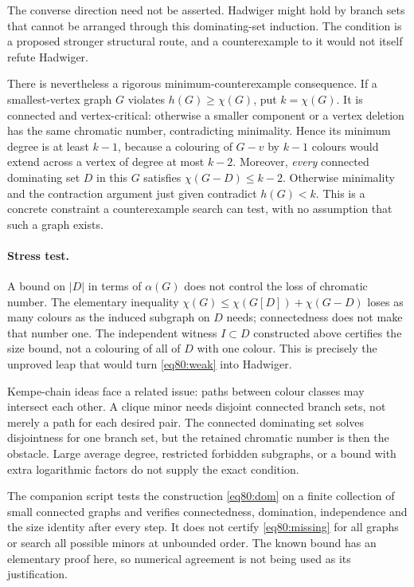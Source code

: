 \documentclass[11pt,a4paper]{article}
\numberwithin{equation}{section}
\begin{document}
The converse direction need not be asserted. Hadwiger might hold by branch
sets that cannot be arranged through this dominating-set induction. The
condition is a proposed stronger structural route, and a counterexample
to it would not itself refute Hadwiger.

There is nevertheless a rigorous minimum-counterexample consequence.
If a smallest-vertex graph $G$ violates $h(G)\geq\chi(G)$, put
$k=\chi(G)$. It is connected and vertex-critical: otherwise a smaller
component or a vertex deletion has the same chromatic number, contradicting
minimality. Hence its minimum degree is at least $k-1$, because a colouring
of $G-v$ by $k-1$ colours would extend across a vertex of degree at most
$k-2$. Moreover, \emph{every} connected dominating set $D$ in this $G$
satisfies $\chi(G-D)\leq k-2$. Otherwise minimality and the contraction
argument just given contradict $h(G)<k$. This is a concrete constraint a
counterexample search can test, with no assumption that such a graph exists.

\paragraph{Stress test.}
A bound on $|D|$ in terms of $\alpha(G)$ does not control the loss of
chromatic number. The elementary inequality
$\chi(G)\leq\chi(G[D])+\chi(G-D)$ loses as many colours as the induced
subgraph on $D$ needs; connectedness does not make that number one.
The independent witness $I\subset D$ constructed above certifies the size
bound, not a colouring of all of $D$ with one colour. This is precisely the
unproved leap that would turn \eqref{eq80:weak} into Hadwiger.

Kempe-chain ideas face a related issue: paths between colour classes may
intersect each other. A clique minor needs disjoint connected branch sets,
not merely a path for each desired pair. The connected dominating set
solves disjointness for one branch set, but the retained chromatic number
is then the obstacle. Large average degree, restricted forbidden subgraphs,
or a bound with extra logarithmic factors do not supply the exact condition.

The companion script tests the construction \eqref{eq80:dom} on a finite
collection of small connected graphs and verifies connectedness, domination,
independence and the size identity after every step. It does not certify
\eqref{eq80:missing} for all graphs or search all possible minors at
unbounded order. The known bound has an elementary proof here, so numerical
agreement is not being used as its justification.
\end{document}
